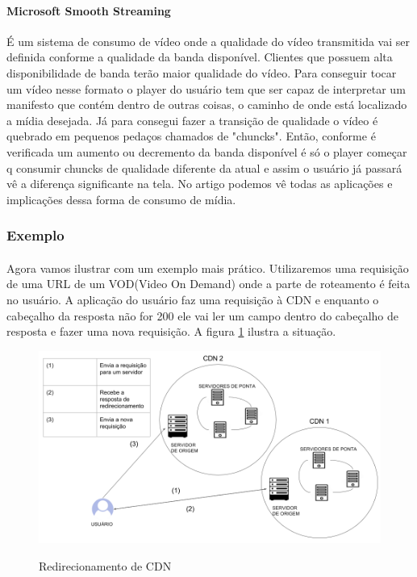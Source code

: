 \paragraph{Microsoft Smooth Streaming} \'E um sistema de consumo de v\'ideo onde a qualidade do v\'ideo transmitida vai ser definida conforme a qualidade da banda dispon\'ivel. Clientes que possuem alta disponibilidade de banda ter\~ao maior qualidade do v\'ideo. 
\newline Para conseguir tocar um v\'ideo nesse formato o player do usu\'ario tem que ser capaz de interpretar um manifesto que cont\'em dentro de outras coisas, o caminho de onde est\'a localizado a m\'idia desejada. 
\newline J\'a para consegui fazer a transi\c{c}\~ao de qualidade o v\'ideo \'e quebrado em pequenos peda\c{c}os chamados de "chuncks". Ent\~ao, conforme \'e verificada um aumento ou decremento da banda dispon\'ivel \'e s\'o o player come\c{c}ar q consumir chuncks de qualidade diferente da atual e assim o usu\'ario j\'a passar\'a v\^e a diferen\c{c}a significante na tela. 
\newline No artigo \cite{zambelli2009iis} podemos v\^e todas as aplica\c{c}\~oes e implica\c{c}\~oes dessa forma de consumo de m\'idia.
\subsubsection{Exemplo}
\label{subsubsection:vod_exemplo}
\paragraph{} Agora vamos ilustrar com um exemplo mais pr\'atico. Utilizaremos uma requisi\c{c}\~ao de uma URL de um VOD(Video On Demand) onde a parte de roteamento \'e feita no usu\'ario. A aplica\c{c}\~ao do usu\'ario faz uma requisi\c{c}\~ao \`a CDN e enquanto o cabe\c{c}alho da resposta n\~ao for 200 ele vai ler um campo dentro do cabe\c{c}alho de resposta e fazer uma nova requisi\c{c}\~ao. A figura  \ref{figura:vod_redirect_exemple} ilustra a situa\c{c}\~ao.

\begin{figure}[H]
\caption{Redirecionamento de CDN}
\includegraphics[width=15cm]{Figuras/vod_redirect_exemple.png} 
\label{figura:vod_redirect_exemple}
\end{figure}

